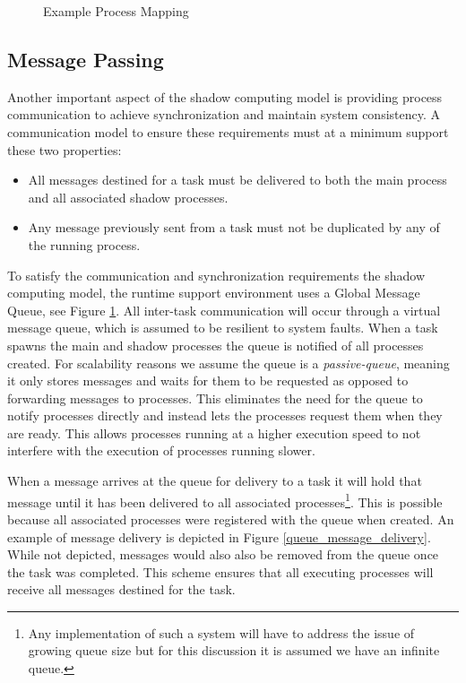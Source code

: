 \begin{figure}[hHtb]
\centering
{}
\caption { Example Process Mapping }
\label{process_allocation_diagram}
\end{figure}

\subsection{Message Passing}

Another important aspect of the shadow computing model is providing
process communication to achieve synchronization and maintain system
consistency.  A communication model to ensure these requirements must
at a minimum support these two properties:
\begin{itemize}
\item
All messages destined for a task must be delivered to both the main
process and all associated shadow processes.
\item
Any message previously sent from a task must not be duplicated by any
of the running process.
\end{itemize}

To satisfy the communication and synchronization requirements the
shadow computing model, the runtime support environment uses a Global
Message Queue, see Figure \ref{process_allocation_diagram}. All
inter-task communication will occur through a virtual message queue,
which is assumed to be resilient to system faults. When a task spawns
the main and shadow processes the queue is notified of all processes
created. For scalability reasons we assume the queue is a {\it
passive-queue}, meaning it only stores messages and waits for them to
be requested as opposed to forwarding messages to processes. This
eliminates the need for the queue to notify processes directly and
instead lets the processes request them when they are ready. This
allows processes running at a higher execution speed to not interfere
with the execution of processes running slower.

When a message arrives at the queue for delivery to a task it will
hold that message until it has been delivered to all associated
processes\footnote{Any implementation of such a system will have to
address the issue of growing queue size but for this discussion it is
assumed we have an infinite queue.}. This is possible because all
associated processes were registered with the queue when created. An
example of message delivery is depicted in Figure
\ref{queue_message_delivery}. While not depicted, messages would also
also be removed from the queue once the task was completed. This
scheme ensures that all executing processes will receive all messages
destined for the task.

